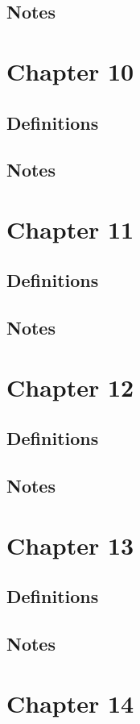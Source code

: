 \documentclass[12pt]{article}
\begin{document}
\subsection{Notes}

\section{Chapter 10}
\subsection{Definitions}
\subsection{Notes}

\section{Chapter 11}
\subsection{Definitions}
\subsection{Notes}

\section{Chapter 12}
\subsection{Definitions}
\subsection{Notes}

\section{Chapter 13}
\subsection{Definitions}
\subsection{Notes}

\section{Chapter 14}
\end{document}
